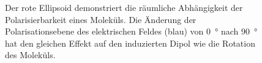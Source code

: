 \documentclass[a4paper,12pt,twoside,parskip=no,headsepline,open=right,ngerman,export]{scrreprt}
\begin{document}
            \begin{figure}[!b]
                \centering
                \caption[Polarisationsabhängigkeit der Polarisierbarkeit]{Der rote Ellipsoid demonstriert die räumliche Abhängigkeit der Polarisierbarkeit eines Moleküls. Die Änderung der Polarisationsebene des elektrischen Feldes (blau) von \SI{0}{\degree}  nach \SI{90}{\degree}  hat den gleichen Effekt auf den induzierten Dipol wie die Rotation des Moleküls.}
                \label{fig:theo_ramanTensor}
            \end{figure}
            
\end{document}
